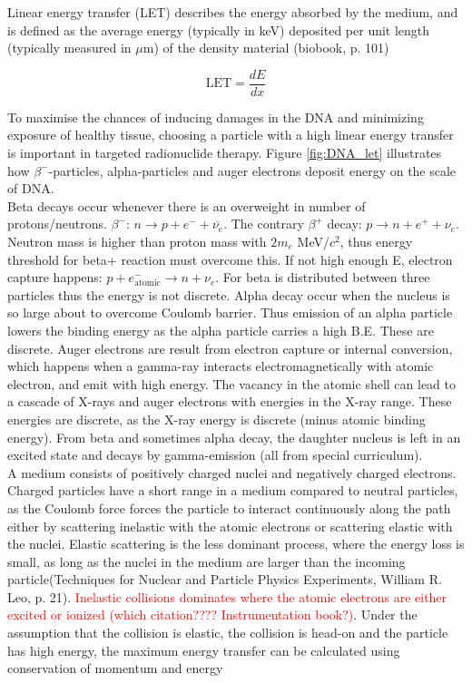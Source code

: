 \documentclass[a4paper,11pt,twoside]{book}
\begin{document}
Linear energy transfer (LET) describes the energy absorbed by the medium, and is defined as the average energy (typically in keV) deposited per unit length (typically measured in $\mu$m) of the density material (biobook, p. 101)

\begin{equation}
    \text{LET}=\frac{dE}{dx}
\end{equation}

To maximise the chances of inducing damages in the DNA and minimizing exposure of healthy tissue, choosing a particle with a high linear energy transfer is important in targeted radionuclide therapy. Figure \ref{fig:DNA_let} illustrates how $\beta^-$-particles, alpha-particles and auger electrons deposit energy on the scale of DNA. \\

Beta decays occur whenever there is an overweight in number of protons/neutrons. $\beta^-$: $n\rightarrow p+e^-+ \overline{\nu_e}$. The contrary $\beta^+$ decay: $p \rightarrow n+e^+ +\nu_e$. Neutron mass is higher than proton mass with $2m_e$ MeV/$c^2$, thus energy threshold for beta+ reaction must overcome this. If not high enough E, electron capture happens: $p+e^-_\text{atomic}\rightarrow n+ \nu_e$. For beta is distributed between three particles thus the energy is not discrete. Alpha decay occur when the nucleus is so large about to overcome Coulomb barrier. Thus emission of an alpha particle lowers the binding energy as the alpha particle carries a high B.E. These are discrete. Auger electrons are result from electron capture or internal conversion, which happens when a gamma-ray interacts electromagnetically with atomic electron, and emit with high energy. The vacancy in the atomic shell can lead to a cascade of X-rays and auger electrons with energies in the X-ray range. These energies are discrete, as the X-ray energy is discrete (minus atomic binding energy). From beta and sometimes alpha decay, the daughter nucleus is left in an excited state and decays by gamma-emission (all from special curriculum).  \\

\noindent A medium consists of positively charged nuclei and negatively charged electrons. Charged particles have a short range in a medium compared to neutral particles, as the Coulomb force forces the particle to interact continuously along the path either by scattering inelastic with the atomic electrons or scattering elastic with the nuclei. Elastic scattering is the less dominant process, where the energy loss is small, as long as the nuclei in the medium are larger than the incoming particle(Techniques for Nuclear and Particle Physics Experiments, William R. Leo, p.  21). \textcolor{red}{Inelastic collisions dominates where the atomic electrons are either excited or ionized (which citation???? Instrumentation book?)}. Under the assumption that the collision is elastic, the collision is head-on and the particle has high energy, the maximum energy transfer can be calculated using conservation of momentum and energy
\end{document}

